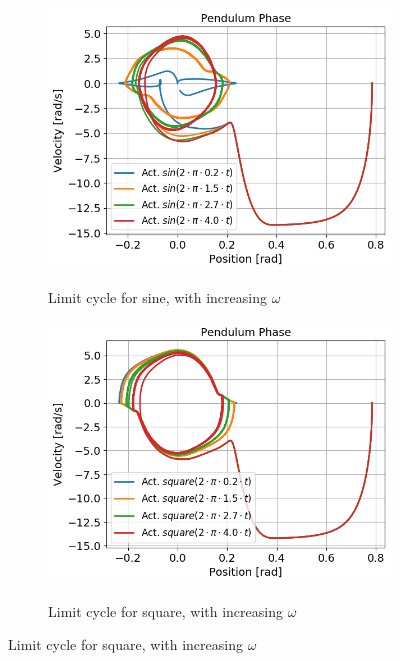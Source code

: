 \documentclass{cmc}
\begin{document}
\begin{figure}[H]
  \centering
  \begin{subfigure}[b]{0.49\textwidth}
    { \centering
      \includegraphics[width=\textwidth]{figures/2c_LimitCycle_sin.png} }
    \caption{Limit cycle for sine, with increasing $\omega$}
    \label{fig:Exercise2cLimitCycleSin}
  \end{subfigure}
  \begin{subfigure}[b]{0.49\textwidth}
    { \centering
      \includegraphics[width=\textwidth]{figures/2c_LimitCycle_square.png} }
    \caption{Limit cycle for square, with increasing $\omega$}
    \label{fig:Exercise2cLimitCycleSquare}
  \end{subfigure}

\end{figure}
\end{document}
